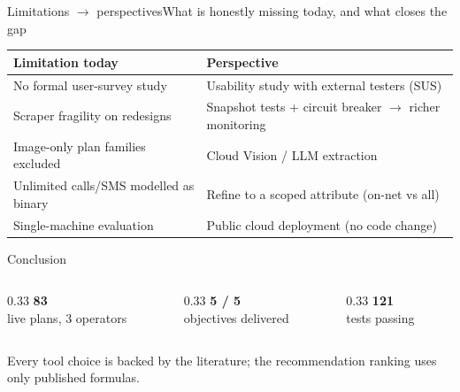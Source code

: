 \documentclass[aspectratio=169,11pt]{beamer}
\newcommand{\hd}[1]{\cellcolor{ink}\color{white}\bfseries #1}
\begin{document}
\begin{frame}{Limitations $\rightarrow$ perspectives}{What is honestly missing today, and what closes the gap}
\centering\small
\renewcommand{\arraystretch}{1.3}
\begin{tabular}{@{}p{5.6cm} p{6.0cm}@{}}
\toprule
\rowcolor{ink}\hd{Limitation today} & \hd{Perspective} \\
\midrule
No formal user-survey study & Usability study with external testers (SUS) \\
Scraper fragility on redesigns & Snapshot tests + circuit breaker $\rightarrow$ richer monitoring \\
Image-only plan families excluded & Cloud Vision / LLM extraction \\
Unlimited calls/SMS modelled as binary & Refine to a scoped attribute (on-net vs all) \\
Single-machine evaluation & Public cloud deployment (no code change) \\
\bottomrule
\end{tabular}
\end{frame}

\begin{frame}{Conclusion}{}
\centering
\vspace{2pt}

\vspace{8pt}
\begin{columns}
\begin{column}{0.33\textwidth}\centering
  {\color{accentdk}\Large\bfseries 83}\\{\color{sec}\footnotesize live plans, 3 operators}\end{column}
\begin{column}{0.33\textwidth}\centering
  {\color{accentdk}\Large\bfseries 5 / 5}\\{\color{sec}\footnotesize objectives delivered}\end{column}
\begin{column}{0.33\textwidth}\centering
  {\color{accentdk}\Large\bfseries 121}\\{\color{sec}\footnotesize tests passing}\end{column}
\end{columns}

\vspace{10pt}
{\color{sec}\footnotesize Every tool choice is backed by the literature; the recommendation ranking uses only published formulas.}
\end{frame}
\end{document}
